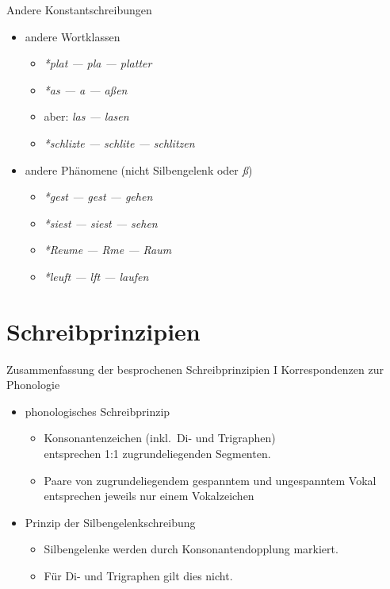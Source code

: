 \begin{frame}
  {Andere Konstantschreibungen}
  \pause
  \begin{itemize}[<+->]
    \item andere Wortklassen
      \begin{itemize}[<+->]
        \item \textit{*plat --- pla --- pla\alert{tt}er}
        \item \textit{*as --- a --- a\alert{ß}en}
        \item aber: \textit{las --- lasen}
        \item \textit{*schlizte --- schlite --- schli\alert{tz}en}
      \end{itemize}
      \Halbzeile
    \item andere Phänomene (nicht Silbengelenk oder \textit{ß})
      \begin{itemize}[<+->]
        \item \textit{*gest --- gest --- ge\alert{h}en}
        \item \textit{*siest --- siest --- se\alert{h}en}
        \item \textit{*Reume --- Rme --- R\alert{au}m}
        \item \textit{*leuft --- lft --- l\alert{au}fen}
      \end{itemize}
  \end{itemize}
\end{frame}

\section{Schreibprinzipien}

\begin{frame}
  {Zusammenfassung der besprochenen Schreibprinzipien I}
  \pause
  Korrespondenzen zur Phonologie\\
  \Zeile
  \pause
  \begin{itemize}[<+->]
    \item \alert{phonologisches Schreibprinzip}
      \begin{itemize}[<+->]
        \item Konsonantenzeichen (inkl.\ Di- und Trigraphen)\\
          entsprechen 1:1 zugrundeliegenden Segmenten.
        \item Paare von zugrundeliegendem gespanntem und ungespanntem Vokal\\
          entsprechen jeweils nur einem Vokalzeichen 
      \end{itemize}
     \Zeile 
    \item \alert{Prinzip der Silbengelenkschreibung}
      \begin{itemize}[<+->]
        \item Silbengelenke werden durch Konsonantendopplung markiert.
        \item Für Di- und Trigraphen gilt dies nicht.
      \end{itemize}
  \end{itemize}
\end{frame}

